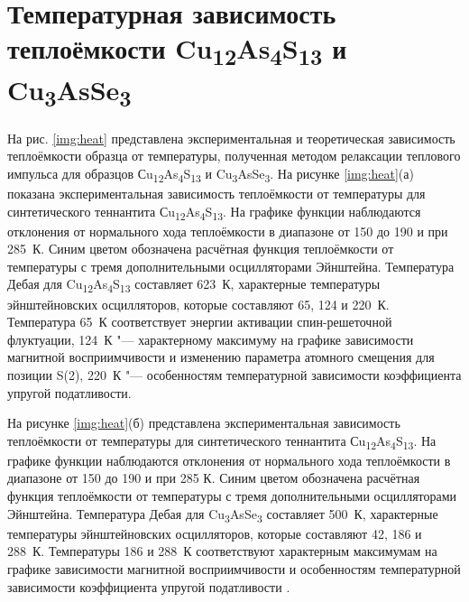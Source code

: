 \section{Температурная зависимость теплоёмкости Cu\textsubscript{12}As\textsubscript{4}S\textsubscript{13} и Cu\textsubscript{3}AsSe\textsubscript{3}} \label{sect3_4}
На рис. \ref{img:heat} представлена экспериментальная и теоретическая зависимость теплоёмкости  образца от температуры, полученная методом релаксации теплового импульса для образцов Сu\textsubscript{12}As\textsubscript{4}S\textsubscript{13} и Cu\textsubscript{3}AsSe\textsubscript{3}.
На рисунке \ref{img:heat}(а) показана экспериментальная зависимость теплоёмкости от температуры для синтетического теннантита Сu\textsubscript{12}As\textsubscript{4}S\textsubscript{13}. На графике функции наблюдаются отклонения от нормального хода теплоёмкости в диапазоне от 150 до 190 и при 285~К. Синим цветом обозначена расчётная функция теплоёмкости от температуры с тремя дополнительными осцилляторами Эйнштейна. Температура Дебая для Cu\textsubscript{12}As\textsubscript{4}S\textsubscript{13} составляет 623~К, характерные температуры эйнштейновских осцилляторов, которые составляют 65, 124 и 220~К. Температура 65~К соответствует энергии активации спин-решеточной флуктуации\cite{Gainov2008,Gainov_2006}, 124~К "--- характерному максимуму на графике зависимости магнитной восприимчивости и изменению параметра атомного смещения для позиции S(2), 220~К "--- особенностям температурной зависимости коэффициента упругой податливости\cite{bab_81}.

На рисунке \ref{img:heat}(б) представлена экспериментальная зависимость теплоёмкости от температуры для синтетического теннантита Сu\textsubscript{12}As\textsubscript{4}S\textsubscript{13}. На графике функции наблюдаются отклонения от нормального хода теплоёмкости в диапазоне от 150 до 190 и при 285 К. Синим цветом обозначена расчётная функция теплоёмкости от температуры с тремя дополнительными осцилляторами Эйнштейна. Температура Дебая для Cu\textsubscript{3}AsSe\textsubscript{3} составляет 500~К, характерные температуры эйнштейновских осцилляторов, которые составляют 42, 186 и 288~К.   Температуры 186 и 288~К соответствуют характерным максимумам на графике зависимости магнитной восприимчивости и  особенностям температурной зависимости коэффициента упругой податливости \cite{bab_81}.

